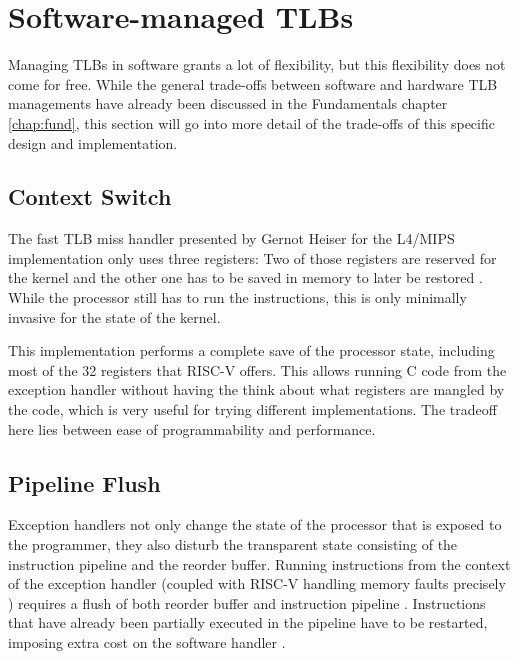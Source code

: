 \section{Software-managed TLBs}
Managing TLBs in software grants a lot of flexibility, but this flexibility does not come
for free. While the general trade-offs between software and hardware TLB managements have
already been discussed in the Fundamentals chapter \ref{chap:fund}, this section will
go into more detail of the trade-offs of this specific design and implementation.

\subsection{Context Switch} The fast TLB miss handler presented by Gernot Heiser for the
L4/MIPS implementation only uses three registers: Two of those registers are reserved
for the kernel and the other one has to be saved in memory to later be restored \cite{heiserAnatomyHighPerformanceMicrokernel}.
While the processor still has to run the instructions, this is only minimally invasive
for the state of the kernel.

This implementation performs a complete save of the processor state, including most of the
32 registers that RISC-V offers.
This allows running C code from the exception handler without having the think about what
registers are mangled by the code, which is very useful for trying different implementations.
The tradeoff here lies between ease of programmability and performance.

\subsection{Pipeline Flush} Exception handlers not only change the state of the processor that is
exposed to the programmer, they also disturb the transparent state consisting of the
instruction pipeline and the reorder buffer.
Running instructions from the context of the exception handler (coupled with RISC-V handling
memory faults precisely \cite{RISCVInstructionSet}) requires a flush of both reorder buffer
and instruction pipeline \cite{jacobVirtualMemoryContemporary1998}.
Instructions that have already been partially executed in the pipeline have to be restarted,
imposing extra cost on the software handler \cite{jacob1998look}.

